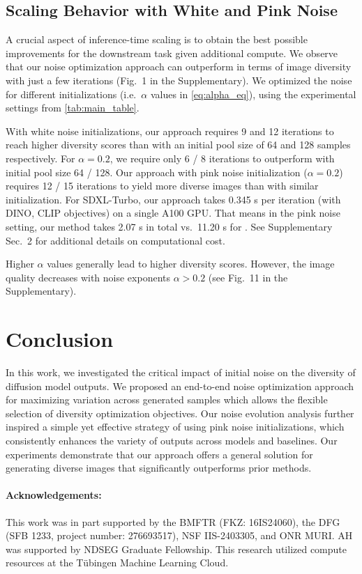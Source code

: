 \documentclass[10pt,twocolumn,letterpaper]{article}
\begin{document}
\subsection{Scaling Behavior with White and Pink Noise}
\label{subsec:scaling}
A crucial aspect of inference-time scaling is to obtain the best possible improvements for the downstream task given additional compute. We observe that our noise optimization approach can outperform \cite{gi} in terms of image diversity with just a few iterations (Fig.~1 in the Supplementary).  
We optimized the noise for different initializations (i.e.\ $\alpha$ values in \cref{eq:alpha_eq}), using the experimental settings from \cref{tab:main_table}.

With white noise initializations, our approach requires 9 and 12 iterations to reach higher diversity scores than \cite{gi} with an initial pool size of 64 and 128 samples respectively. For $\alpha=0.2$, we require only 6 / 8 iterations to outperform \cite{gi} with initial pool size 64 / 128.
Our approach with pink noise initialization ($\alpha=0.2$) requires 12 / 15 iterations to yield more diverse images than \cite{gi} with similar initialization. For SDXL-Turbo, our approach takes 0.345 s per iteration (with DINO, CLIP objectives) on a single A100 GPU. That means in the pink noise setting, our method takes 2.07 s in total vs.\ 11.20 s for \cite{gi}. See Supplementary Sec.~2 for additional details on computational cost.

Higher $\alpha$ values generally lead to higher diversity scores. However, the image quality decreases with noise exponents $\alpha>0.2$ (see Fig.~11 in the Supplementary). 


\section{Conclusion}
In this work, we investigated the critical impact of initial noise on the diversity of diffusion model outputs. We proposed an end-to-end noise optimization approach for maximizing variation across generated samples which allows the flexible selection of diversity optimization objectives. Our noise evolution analysis further inspired a simple yet effective strategy of using pink noise initializations, which consistently enhances the variety of outputs across models and baselines. Our experiments demonstrate that our approach offers a general solution for generating diverse images that significantly outperforms prior methods.

\paragraph{Acknowledgements:}
This work was in part supported by the BMFTR (FKZ: 16IS24060), the DFG (SFB 1233, project number: 276693517), NSF IIS-2403305, and ONR MURI. AH was supported by NDSEG Graduate Fellowship. This research utilized compute resources at the Tübingen Machine Learning Cloud.
\end{document}
